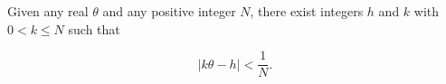 Given any real $\theta$ and any positive integer $N$, there exist integers $h$ and $k$ with $0 < k \leq N$ such that

$$|k\theta - h| < \frac{1}{N}.$$
